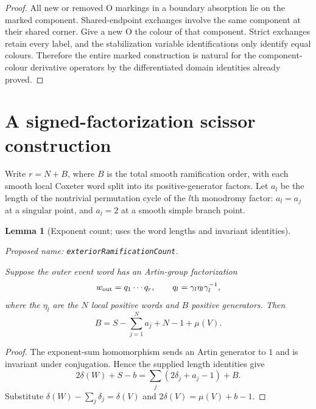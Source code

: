 \documentclass[11pt,a4paper]{article}
\newtheorem{lemma}[theorem]{Lemma}
\theoremstyle{remark}
\newcommand{\formalname}[1]{\leavevmode\par\noindent\textnormal{\small Proposed name: \texttt{#1}.}\par\smallskip}
\begin{document}
\begin{proof}
All new or removed O markings in a boundary absorption lie on the
marked component.  Shared-endpoint exchanges involve the same
component at their shared corner.  Give a new O the colour of that
component.  Strict exchanges retain every label, and the stabilization
variable identifications only identify equal colours.  Therefore the
entire marked construction is natural for the component-colour
derivative operators by the differentiated domain identities already
proved.

\end{proof}


\section{A signed-factorization scissor construction}

Write $r=N+B$, where $B$ is the total smooth ramification order,
with each smooth local Coxeter word split into its positive-generator factors.  Let $a_l$ be the
length of the nontrivial permutation cycle of the $l$th monodromy factor:
$a_l=a_j$ at a singular point, and $a_l=2$ at a smooth simple branch point.

\begin{lemma}[Exponent count; uses the word lengths and invariant identities]
\label{lem:exponent-count}
\formalname{exteriorRamificationCount}
Suppose the outer event word has an Artin-group factorization
\[
 w_{\rm out}=q_1\cdots q_r,
 \qquad q_l=\gamma_l\eta_l\gamma_l^{-1},
\]
where the $\eta_l$ are the $N$ local positive words and $B$ positive generators.
Then
\[
 B=S-\sum_{j=1}^N a_j+N-1+\mu(V).
\]
\end{lemma}
\begin{proof}
The exponent-sum homomorphism sends an Artin generator to $1$ and is invariant
under conjugation.  Hence the supplied length identities give
\[
 2\delta(W)+S-b
 =\sum_j(2\delta_j+a_j-1)+B.
\]
Substitute $\delta(W)-\sum_j\delta_j=\delta(V)$ and
$2\delta(V)=\mu(V)+b-1$.
\end{proof}
\end{document}

